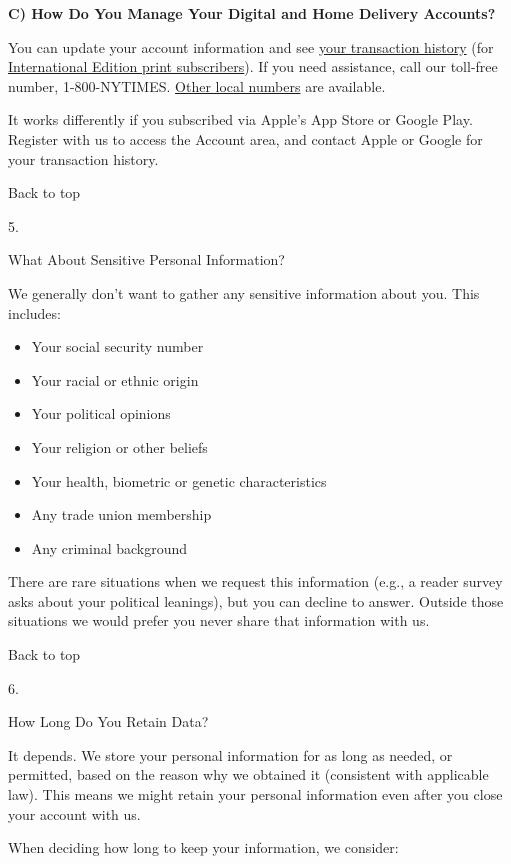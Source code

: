 \textbf{C) How Do You Manage Your Digital and Home Delivery Accounts?}

You can update your account information and see
\href{https://myaccount.nytimes.com}{your transaction history} (for
\href{https://customercare.inyt.com}{International Edition print
subscribers}). If you need assistance, call our toll-free number,
1-800-NYTIMES.
\href{https://subscribe.inyt.com/footer?requestAction=displayContactIht}{Other
local numbers} are available.

It works differently if you subscribed via Apple's App Store or Google
Play. Register with us to access the Account area, and contact Apple or
Google for your transaction history.

Back to top

5.

What About Sensitive Personal Information?

We generally don't want to gather any sensitive information about you.
This includes:

\begin{itemize}
\tightlist
\item
  Your social security number
\item
  Your racial or ethnic origin
\item
  Your political opinions
\item
  Your religion or other beliefs
\item
  Your health, biometric or genetic characteristics
\item
  Any trade union membership
\item
  Any criminal background
\end{itemize}

There are rare situations when we request this information (e.g., a
reader survey asks about your political leanings), but you can decline
to answer. Outside those situations we would prefer you never share that
information with us.

Back to top

6.

How Long Do You Retain Data?

It depends. We store your personal information for as long as needed, or
permitted, based on the reason why we obtained it (consistent with
applicable law). This means we might retain your personal information
even after you close your account with us.

When deciding how long to keep your information, we consider:

